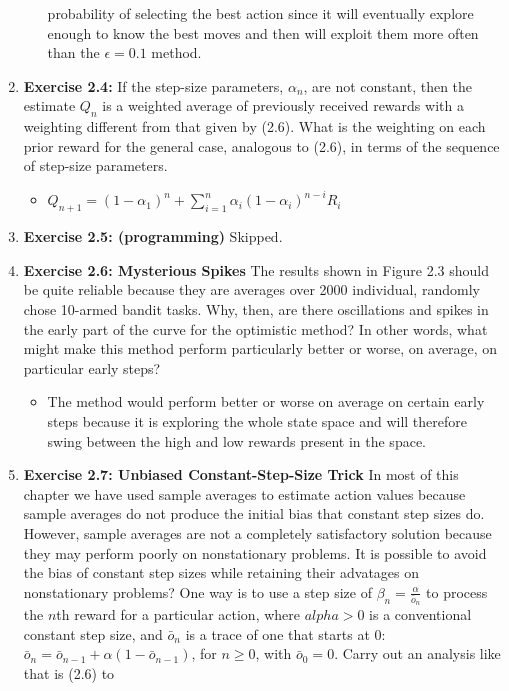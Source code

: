 \documentclass[12pt]{article}
\begin{document}
\begin{enumerate}[label=(\alph*)]
\begin{itemize}
    probability of selecting the best action since it will eventually explore enough to know the best moves and then will
    exploit them more often than the $\epsilon = 0.1$ method. 
  \end{itemize}
  \item \textbf{Exercise 2.4:} If the step-size parameters, $\alpha_n$, are not constant, then the estimate $Q_n$ is a
  weighted average of previously received rewards with a weighting different from that given by (2.6). What is the
  weighting on each prior reward for the general case, analogous to (2.6), in terms of the sequence of step-size parameters.
  \begin{itemize}
    \item $Q_{n+1} = (1 - \alpha_1)^n + \sum_{i = 1}^{n}\alpha_i(1 - \alpha_i)^{n - i}R_i$
  \end{itemize}
  \item \textbf{Exercise 2.5: (programming)} Skipped.
  \item \textbf{Exercise 2.6: Mysterious Spikes} The results shown in Figure 2.3 should be quite reliable because they are
  averages over 2000 individual, randomly chose 10-armed bandit tasks. Why, then, are there oscillations and spikes in the early
  part of the curve for the optimistic method? In other words, what might make this method perform particularly better or worse,
  on average, on particular early steps?
  \begin{itemize}
    \item The method would perform better or worse on average on certain early steps because it is exploring the whole state space
    and will therefore swing between the high and low rewards present in the space.
  \end{itemize}
  \item \textbf{Exercise 2.7: Unbiased Constant-Step-Size Trick} In most of this chapter we have used sample averages to estimate action
  values because sample averages do not produce the initial bias that constant step sizes do. However, sample averages are not a completely
  satisfactory solution because they may perform poorly on nonstationary problems. It is possible to avoid the bias of constant step sizes
  while retaining their advatages on nonstationary problems? One way is to use a step size of $\beta_n = \frac{\alpha}{\bar{o}_n}$ to process 
  the $n$th reward for a particular action, where $alpha > 0$ is a conventional constant step size, and $\bar{o}_n$ is a trace of one that starts
  at 0: $\bar{o}_n = \bar{o}_{n-1} + \alpha(1 - \bar{o}_{n-1})$, for $n \ge 0$, with $\bar{o}_0 = 0$. Carry out an analysis like that is (2.6) to

\end{enumerate}
\end{document}
